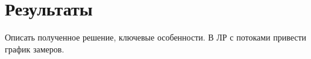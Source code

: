\section{Результаты}

Описать полученное решение, ключевые особенности. В ЛР с потоками привести график замеров.
